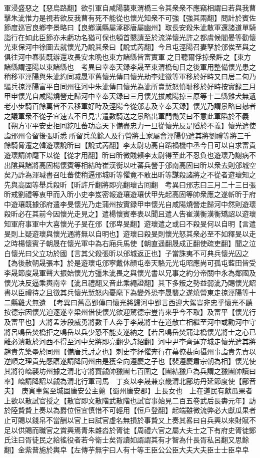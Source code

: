 軍浸盛惡之【惡烏路翻】欲引軍自咸陽襲東渭橋三令其衆衆不應竊相謂曰若與我曹擊朱泚惟力是視若欲反我曹有死不能從也懷光知衆不可強【強其兩翻】問計於賓佐節度廵官良鄉李景略曰【良鄉漢縣屬涿郡唐屬幽州】取長安殺朱泚散軍還諸道單騎詣行在如此臣節亦未虧功名猶可保也頓首懇請至於流涕懷光許之都虞候閻晏等勸懷光東保河中徐圖去就懷光乃說其衆曰【說式芮翻】今且屯涇陽召妻孥於邠俟至與之俱往河中春裝既辦還攻長安未晩也東方諸縣皆富實軍之日聽爾俘掠衆許之【東方諸縣謂涇陽以東諸縣也　考異曰幸奉天録李晟至東渭橋旬日之後軍用整備懷光患之稍移軍涇陽與朱泚約同㓕晟軍舊懷光傳曰懷光劫李建徽等軍移於好畤又曰居二旬乃驅兵掠涇陽富平自同州往河中朱泚傳曰懷光為泚所賣慙怒憤耻移於好畤按實録三月甲申懷光自咸陽燒營走歸河中幸奉天録曰三月懷光拔咸陽掠三原等十二縣雞犬無遺老小步騎百餘萬皆不云移軍好畤及涇陽今從邠志及幸奉天録】懷光乃謂景略曰曏者之議軍衆不從子宜速去不且見害遣數騎送之景略出軍門慟哭曰不意此軍䧟於不義【朔方軍平安史拒囘紇吐蕃功高天下備盡忠力一旦從懷光反是䧟於不義】懷光遣使詣邠州令留後張昕悉所留兵萬餘人及行營將士家屬會涇陽仍遣其將劉禮等將三千餘騎脅遷之韓遊瓌說昕曰【說式芮翻】李太尉功高自蹈禍機中丞今日可以自求富貴遊瓌請帥麾下以從【從才用翻】昕曰昕微賤賴李太尉得至此不忍負也遊瓌乃謝病不出隂與諸將高固楊懷賓等相結時崔漢衡以吐蕃兵營于邠南高固曰昕以衆去則邠城空矣乃詐為渾瑊書召吐蕃使稍逼邠城昕等懼竟不敢出昕等謀殺諸將之不從者遊瓌知之先與高固等舉兵殺昕【昕許斤翻將即亮翻瓌古囘翻　考異曰邠志曰三月二十三日張昕戒劉禮等衷甲而入昕小史李岌密報遊瓖遊瓖伏甲先起高固等帥衆應之遂斬昕于府中遊瓖既據邠府遣李旻懷光乃走蒲州按實録甲申懷光自咸陽燒營走歸河中然則遊瓌殺昕必在其前今因懷光走見之】遣楊懷賓奉表以聞且遣人告崔漢衡漢衡矯詔以遊瓌知軍府事軍中大喜懷光子旻在邠【邠卑旻翻】遊瓌遣之或曰不殺旻何以自明【言遣旻則上疑遊瓌與懷光通將無以自明也】遊瓌曰殺旻則懷光怒其衆必至不如釋旻以走之時楊懷賓子朝晟在懷光軍中為右廂兵馬使【朝直遥翻晟成正翻使疏吏翻】聞之泣白懷光曰父立功於國【言其父殺張昕以邠城返正也】子當誅夷不可典兵懷光囚之【為後赦朝晟張本】於是遊瓌屯邠寧戴休顔屯奉天駱元光屯昭應尚可孤屯藍田皆受李晟節度晟軍聲大振始懷光方彊朱泚畏之與懷光書以兄事之約分帝關中永為鄰國及懷光决反逼乘輿南幸【泚且禮翻又音此乘繩證翻】其下多叛之勢益弱泚乃賜懷光詔書以臣禮待之且徵其兵懷光慙怒内憂麾下為變外恐李晟襲之遂燒營東走掠涇陽等十二縣雞犬無遺　【考異曰舊高郢傳曰懷光將歸河中郢言西迎大駕豈非忠乎懷光不聽按德宗因懷光迫逐遂幸梁州借使懷光欲迎駕德宗豈肯來乎今不取】及富平【懷光行及富平也】大將孟涉段威勇將數千人奔于李晟將士在道散亡相繼至河中或勸河中守將呂鳴岳焚橋拒之鳴岳以兵少恐不能支遂納之【若呂鳴岳焚蒲津橋懷光將士之心已離必潰散於河西不得至河中矣將即亮翻少詩紹翻】河中尹李齊運弃城走懷光遣其將趙貴先築壘於同州【備唐兵討之也】刺史李紓懼奔行在幕僚裴向攝州事詣貴先責以逆順之理貴先感寤遂請降同州由是獲全向遵慶之子也【裴遵慶肅宗朝為相】懷光使其將符嶠襲坊州據之渭北守將竇覦帥獵團七百圍之【團結獵戶為兵謂之獵團帥讀曰率】嶠請降詔以覦為渭北行軍司馬　丁亥以李晟兼京畿渭北鄜坊丹延節度使【鄜音夫】　庚寅車駕至城固唐安公主薨【蜀州唐安郡】上長女也　上在道民有獻瓜果者上欲以散試官授之【散官即文散階武散階也試官事始見二百五卷武后長夀元年】訪於陸贄贄上奏以為爵位恒宜慎惜不可輕用【恒戶登翻】起端雖微流弊必大獻瓜果者止可賜以錢帛不當酬以官上曰試官虛名無損於事贄又上奏其畧曰自兵興以來財賦不足以供賜而職官之賞興焉青朱雜㳫於胥徒【周禮六官之屬大夫士之下有府史胥徒鄭氏注曰胥徒民之給徭役者若今衛士矣胥讀如諝謂其有才智為什長胥私呂翻又思餘翻】金紫普施於輿皁【左傳芋無宇曰人有十等王臣公公臣大夫大夫臣士士臣皁皁